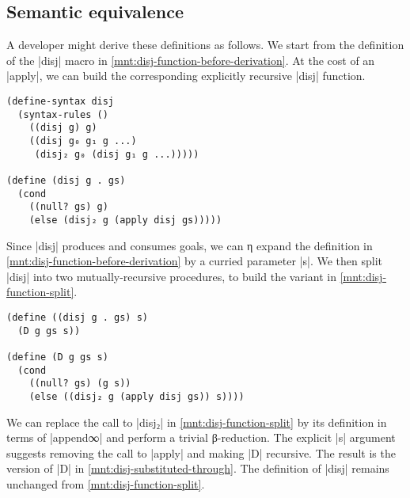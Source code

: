 \documentclass[sigplan,draft,natbib=false]{acmart}
\begin{document}
\subsection{Semantic equivalence}

A developer might derive these definitions as follows. We start from
the definition of the \rackinline|disj| macro in
\cref{mnt:disj-function-before-derivation}. At the cost of an
\rackinline|apply|, we can build the corresponding explicitly
recursive \rackinline|disj| function.

\begin{listing}[h]
\begin{verbatim}
(define-syntax disj
  (syntax-rules ()
    ((disj g) g)
    ((disj g₀ g₁ g ...)
     (disj₂ g₀ (disj g₁ g ...)))))

(define (disj g . gs)
  (cond
    ((null? gs) g)
    (else (disj₂ g (apply disj gs)))))
\end{verbatim}
  \caption{Deriving \rackinline|disj| function from macro}
  \label{mnt:disj-function-before-derivation}
\end{listing}

\noindent Since \rackinline|disj| produces and consumes goals, we can
η expand the definition in \cref{mnt:disj-function-before-derivation}
by a curried parameter \rackinline|s|. We then split \rackinline|disj|
into two mutually-recursive procedures, to build the variant in
\cref{mnt:disj-function-split}.

\begin{listing}[h]
\begin{verbatim}
(define ((disj g . gs) s)
  (D g gs s))

(define (D g gs s)
  (cond
    ((null? gs) (g s))
    (else ((disj₂ g (apply disj gs)) s))))
\end{verbatim}
  \caption{An η expanded and split definition of \rackinline|disj|}
  \label{mnt:disj-function-split}
\end{listing}

\noindent We can replace the call to \rackinline|disj₂| in
\cref{mnt:disj-function-split} by its definition in terms of
\rackinline|append∞| and perform a trivial β-reduction. The explicit
\rackinline|s| argument suggests removing the call to
\rackinline|apply| and making \rackinline|D| recursive. The result is
the version of \rackinline|D| in \cref{mnt:disj-substituted-through}.
The definition of \rackinline|disj| remains unchanged from
\cref{mnt:disj-function-split}.
\end{document}
